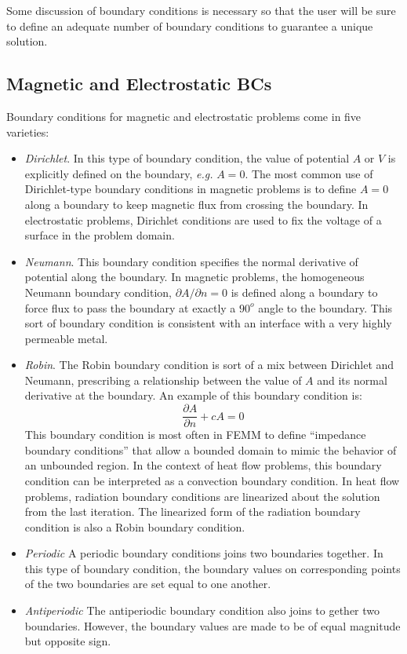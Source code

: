\documentclass[12pt]{report}
\begin{document}
Some discussion of boundary conditions is necessary so that the
user will be sure to define an adequate number of boundary
conditions to guarantee a unique solution.  

\subsection{Magnetic and Electrostatic BCs}

Boundary conditions for magnetic and electrostatic problems come in five varieties:

\begin{itemize}
\item {\em Dirichlet}. In this type of boundary condition, the
value of potential $A$ or $V$ is explicitly defined on the
boundary, {\em e.g.} $A=0$.  The most common use of Dirichlet-type
boundary conditions in magnetic problems is to define $A=0$ along a
boundary to keep magnetic flux from crossing the boundary.  In
electrostatic problems, Dirichlet conditions are used to fix the
voltage of a surface in the problem domain.
\item {\em Neumann}. This boundary condition specifies the normal
derivative of potential along the boundary.  In magnetic problems,
the homogeneous Neumann boundary condition, $\partial A/\partial n
= 0$ is defined along a boundary to force flux to pass the boundary
at exactly a $90^o$ angle to the boundary. This sort of boundary
condition is consistent with an interface with a very highly
permeable metal.
\item {\em Robin}. The Robin boundary condition is sort of a mix
between Dirichlet and Neumann, prescribing a relationship between
the value of $A$ and its normal derivative at the boundary.  An
example of this boundary condition is:
\begin{displaymath}
\frac{\partial A}{\partial n} + c A = 0
\end{displaymath}
This boundary condition is most often in FEMM to define ``impedance
boundary conditions'' that allow a bounded domain to mimic the
behavior of an unbounded region.  In the context of heat flow problems,
this boundary condition can be interpreted as a convection boundary condition.
In heat flow problems, radiation boundary conditions are linearized about 
the solution from the last iteration. The linearized form of the radiation
boundary condition is also a Robin boundary condition.
\item {\em Periodic}
A periodic boundary conditions joins two boundaries together.  In this
type of boundary condition, the boundary values on 
corresponding points of the two boundaries are set equal to one another.
\item {\em Antiperiodic}
The antiperiodic boundary condition also joins to gether two boundaries.
However, the boundary values are made to be of equal magnitude but
opposite sign.
\end{itemize}
\end{document}

